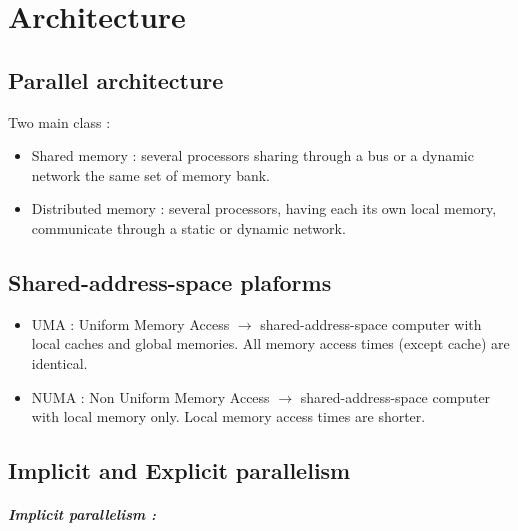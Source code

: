 \documentclass[11pt,a4paper]{report}
\begin{document}

\chapter{Architecture} %
\label{cha:Architecture}

\section{Parallel architecture} %
\label{sec:Parallel architecture}

Two main class :
\begin{itemize}
    \item Shared memory : several processors sharing through a bus or a dynamic network the same set of memory bank.
    \item Distributed memory : several processors, having each its own local memory, communicate through a static or dynamic network.
\end{itemize}


\section{Shared-address-space plaforms} %
\label{sec:Shared-address-space plaforms}

\begin{itemize}
    \item UMA : Uniform Memory Access $\rightarrow$ shared-address-space computer with local caches and global memories. All memory access times (except cache) are identical.
    \item NUMA : Non Uniform Memory Access $\rightarrow$ shared-address-space computer with local memory only. Local memory access times are shorter.
\end{itemize}


\section{Implicit and Explicit parallelism} %
\label{sec:Implicit and Explicit parallelism}

\paragraph*{Implicit parallelism :}
\end{document}
